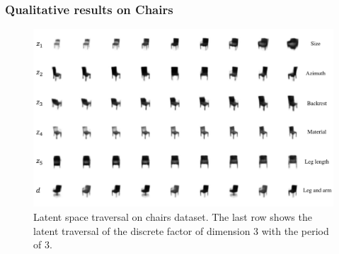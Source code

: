 \documentclass[10pt,mathserif]{beamer}
\begin{document}
\begin{frame}
\frametitle{Qualitative results on Chairs}
\begin{figure}[htbp]
\centering
\includegraphics[width=\linewidth]{chairs}
\caption{Latent space traversal on chairs dataset. The last row shows the latent traversal of the discrete factor of dimension 3 with the period of 3.}
\label{fig:chairs_latent_traversal}
\end{figure}
\end{frame}
\end{document}
